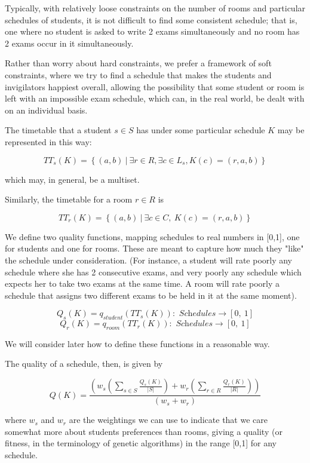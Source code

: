 \documentclass[letterpaper]{article}
\begin{document}
  Typically, with relatively loose constraints on the number of rooms and 
  particular schedules of students, it is not difficult to find some consistent
  schedule; that is, one where no student is asked to write 2 exams
  simultaneously and no room has 2 exams occur in it simultaneously.

  Rather than worry about hard constraints, we prefer a framework of soft 
  constraints, where we try to find a schedule that makes the students and 
  invigilators happiest overall, allowing the possibility that some student 
  or room is left with an impossible exam schedule, which can, in the real 
  world, be dealt with on an individual basis.
  
  The timetable that a student $s \in S$ has under some particular schedule 
  $K$ may be represented in this way:
  
  \[ TT_s(K) = \left\{(a, b)\ |\ \exists r \in R, \exists c \in L_s, K(c)=(r, a, b) \right\} \]
  
  which may, in general, be a multiset.
  
  Similarly, the timetable for a room $r \in R$ is
  
  \[ TT_r(K)=\left\{(a, b)\ |\ \exists c\in C,\ K(c)=(r, a, b)\right\} \]
  
  We define two quality functions, mapping schedules to real numbers in [0,1],
  one for students and one for rooms. These are meant to capture how much they
  "like" the schedule under consideration. (For instance, a student will rate
  poorly any schedule where she has 2 consecutive exams, and very poorly any 
  schedule which expects her to take two exams at the same time. A room will 
  rate poorly a schedule that assigns two different exams to be held in it at 
  the same moment).
  
  \[ Q_s(K)=q_{student}\left(TT_s(K)\right):\textit{ Schedules}\rightarrow [0,\ 1] \]
  \[ Q_r(K)=q_{room}\left(TT_r(K)\right):\textit{ Schedules}\rightarrow [0,\ 1] \]
  
  We will consider later how to define these functions in a reasonable way.

  The quality of a schedule, then, is given by
  
  \[ Q(K)= \frac{\left(w_s\left(\sum_{s \in S}{\frac{Q_s(K)}{|S|}}\right) +
     w_r\left(\sum_{r\in R}{\frac{Q_r(K)}{|R|}} \right)\right)}{(w_s+w_r)} \]
  
  where $w_s$ and $w_r$ are the weightings we can use to indicate that we 
  care somewhat more about students preferences than rooms, giving a quality
  (or fitness, in the terminology of genetic algorithms) in the range [0,1] for
  any schedule.
  
\end{document}
